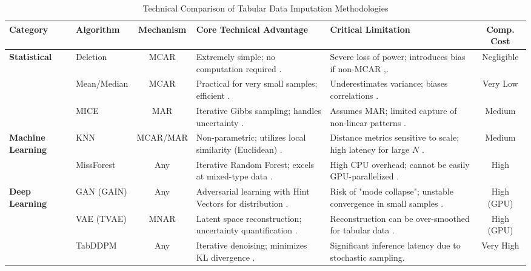 \documentclass[twocolumn, 9pt]{extarticle}
\begin{document}
\begin{table}[htbp]
\centering
\caption{Technical Comparison of Tabular Data Imputation Methodologies}
\label{tab:imputation_comprehensive}
\begin{tabularx}{\textwidth}{|l|l|c|X|X|c|}
\hline
\textbf{Category} & \textbf{Algorithm} & \textbf{Mechanism} & \textbf{Core Technical Advantage} & \textbf{Critical Limitation} & \textbf{Comp. Cost} \\ \hline
\multirow{3}{*}{\textbf{Statistical}} & Deletion & MCAR & Extremely simple; no computation required \cite{little2019statistical}. & Severe loss of power; introduces bias if non-MCAR \cite{popovich2025treat},\cite{little2019statistical}. & Negligible \\ \cline{2-6} 
 & Mean/Median & MCAR & Practical for very small samples; efficient \cite{popovich2025treat}. & Underestimates variance; biases correlations \cite{popovich2025treat}. & Very Low \\ \cline{2-6} 
 & MICE & MAR & Iterative Gibbs sampling; handles uncertainty \cite{Azur2011}. & Assumes MAR; limited capture of non-linear patterns \cite{Azur2011}. & Medium \\ \hline
\multirow{2}{*}{\textbf{Machine Learning}} & KNN & MCAR/MAR & Non-parametric; utilizes local similarity (Euclidean) \cite{Bertsimas2018}. & Distance metrics sensitive to scale; high latency for large $N$ \cite{Bertsimas2018}. & Medium \\ \cline{2-6} 
 & MissForest & Any & Iterative Random Forest; excels at mixed-type data \cite{Stekhoven2012}. & High CPU overhead; cannot be easily GPU-parallelized \cite{Stekhoven2012}. & High \\ \hline
\multirow{3}{*}{\textbf{Deep Learning}} & GAN (GAIN) & Any & Adversarial learning with Hint Vectors for distribution \cite{Yoon2018}. & Risk of "mode collapse"; unstable convergence in small samples \cite{Yoon2018}. & High (GPU) \\ \cline{2-6} 
 & VAE (TVAE) & MNAR & Latent space reconstruction; uncertainty quantification \cite{Mattei2019}. & Reconstruction can be over-smoothed for tabular data \cite{Grinsztajn2022}. & High (GPU) \\ \cline{2-6} 
 & TabDDPM & Any & Iterative denoising; minimizes KL divergence \cite{Kotelnikov2023}. & Significant inference latency due to stochastic sampling. & Very High \\ \hline

\end{tabularx}
\end{table}
\end{document}
